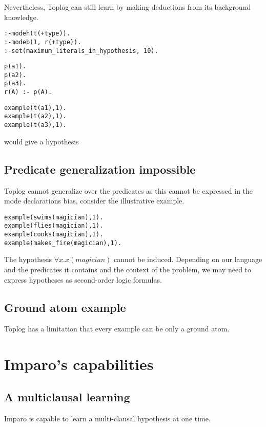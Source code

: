 Nevertheless, Toplog can still learn by making deductions from its background knowledge.

\begin{lstlisting}
:-modeh(t(+type)).
:-modeb(1, r(+type)).
:-set(maximum_literals_in_hypothesis, 10).
\end{lstlisting}
\begin{minipage}[t]{.35\textwidth}
\begin{lstlisting}
p(a1).
p(a2).
p(a3).
r(A) :- p(A).
\end{lstlisting}
\end{minipage}
\begin{minipage}[t]{.20\textwidth}
\begin{lstlisting}
example(t(a1),1).
example(t(a2),1).
example(t(a3),1).
\end{lstlisting}
\end{minipage}

would give a hypothesis 

\subsection{Predicate generalization impossible}
Toplog cannot generalize over the predicates as this cannot be expressed in the mode declarations bias, consider the illustrative example.
\begin{lstlisting}
example(swims(magician),1).
example(flies(magician),1).
example(cooks(magician),1).
example(makes_fire(magician),1).
\end{lstlisting}
The hypothesis $\forall x. x(magician)$ cannot be induced. Depending on our language and the predicates it contains and the context of the problem, we may need to express hypotheses as second-order logic formulas.

\subsection{Ground atom example}
Toplog has a limitation that every example can be only a ground atom.

\section{Imparo's capabilities}
\subsection{A multiclausal learning}
Imparo is capable to learn a multi-clausal hypothesis at one time.

